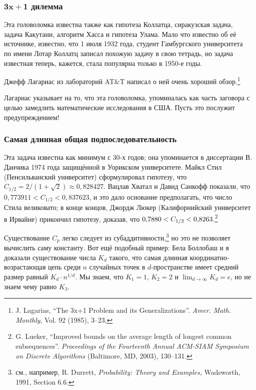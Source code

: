 \subsubsection*{$\bm{3x+1}$ дилемма}

Эта головоломка известна также как гипотеза Коллатца, сиракузская задача, задача Какутани, алгоритм Хасса и гипотеза Улама.
Мало что известно об её источнике, известно, что 1 июля 1932 года, студент Гамбургского университета по имени Лотар Коллатц записал похожую задачу в свою тетрадь, но задача известная теперь, кажется, стала популярна только в 1950-е годы.

Джефф Лагариас из лабораторий AT\&T написал о ней очень хороший обзор.\footnote{J. Lagarias, ``The 3x+1 Problem and its Generalizations''. \emph{Amer. Math. Monthly}, Vol. 92 (1985), 3--23,%
}

Лагариас указывает на то, что эта головоломка, упоминалась как часть заговора с целью замедлить математические исследования в США.
Пусть это послужит предупреждением!

\subsubsection*{Самая длинная общая подпоследовательность}

Эта задача известна как минимум с 30-х годов; она упоминается в диссертации В. Данчика 1974 года защищённой в Уорикском университете.
Майкл Стил (Пенсильванский университет) сформулировал гипотезу, что $C_{1/2} = 2/(1+\sqrt{2})\approx 0{,}828427$.
Вацлав Хватал и Давид Санкофф показали, что $0{,}773911 < C_{1/2} < 0{,}837623$, и это дало основание предполагать, что число Стила великовато;
в конце концов, Джордж Люкер (Калифорнийский университет в Ирвайне) прикончил гипотезу, доказав, что $0{,}7880 \z< C_{1/2} \z< 0{,}8263$.\footnote{
G. Lueker, 
``Improved bounds on the average length of longest common subsequences''. \emph{Proceedings of the Fourteenth Annual ACM-SIAM Symposium on Discrete Algorithms} (Baltimore, MD, 2003), 130–131.}

Существование $C_p$ легко следует из субаддитивности,\footnote{см., например, R. Durrett, \textit{Probability: Theory and Examples,} Wadsworth, 1991, Section 6.6.} но это не позволяет вычислить саму константу.
Вот ещё подобный пример: Бела Боллобаш и я доказали существование числа $K_d$ такого, что самая длинная координатно-возрастающая цепь среди $n$ случайных точек в $d$-пространстве имеет средний размер равный $K_d\cdot n^{1/d}$.
Мы знаем, что $K_1=1$, $K_2=2$ и $\lim_{d\to\infty} K_d=e$, но не знаем чему равно $K_3$.

